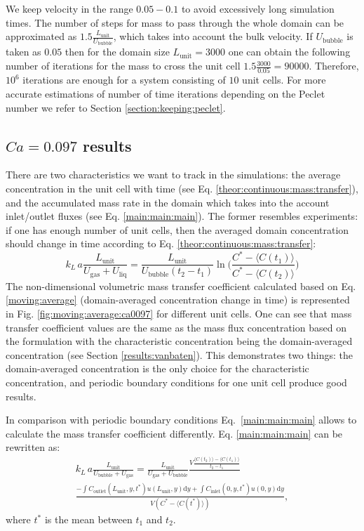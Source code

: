 \documentclass{article}
\newcommand{\beq}{\begin{equation}}
\newcommand{\feq}{\end{equation}}
\newcommand{\vol}{k_L\,a}
\newcommand{\lunit}{L_{\mathrm{unit}}}
\newcommand{\ububble}{U_{\mathrm{bubble}}}
\newcommand{\uliq}{U_{\mathrm{liq}}}
\newcommand{\ugas}{U_{\mathrm{gas}}}
\newcommand{\cinlet}{C_{\mathrm{inlet}}}
\newcommand{\coutlet}{C_{\mathrm{outlet}}}
\newcommand{\cstar}{C^{*}}
\newcommand{\volnondim}{\vol \frac{\lunit}{\ububble+\ugas}}
\begin{document}
We keep velocity in the range $0.05-0.1$ to avoid excessively long simulation times.
The number of steps for mass to pass through the whole domain can be approximated as $1.5 \frac{\lunit}{\ububble}$, which takes into account the bulk
velocity. If $\ububble$ is taken as $0.05$ then for
the domain size $\lunit=3000$ one can obtain the following number of iterations for the mass to
cross the unit cell $1.5 \frac{3000}{0.05}=90000$. Therefore, $10^{6}$ iterations are enough
for a system consisting of $10$ unit cells. For more accurate estimations of number of time
iterations depending on the Peclet number we refer to Section \ref{section:keeping:peclet}.

\subsection{$Ca=0.097$ results}
There are two characteristics we want to track in the simulations: the average
concentration in
the unit cell with time (see Eq. \ref{theor:continuous:mass:transfer}), and the accumulated mass
rate in the domain which takes into the account inlet/outlet fluxes (see Eq. \ref{main:main:main}). The former
resembles experiments: if one has enough number of unit cells, then the averaged domain
concentration should change in time according to Eq. \ref{theor:continuous:mass:transfer}: 
\beq
\label{moving:average}
\vol\frac{\lunit}{\ugas+\uliq}=\frac{\lunit}{\ububble (t_2
-t_1)}\ln\biggl(\frac{C^*-\langle C(t_1) \rangle}{C^*-\langle C(t_2)\rangle}\biggr)
\feq
The non-dimensional volumetric mass transfer coefficient calculated based on Eq.
\ref{moving:average} (domain-averaged concentration change in time) is
represented in Fig. \ref{fig:moving:average:ca0097} for different unit cells. One can see that mass transfer coefficient values are the same as the mass flux
concentration based on the \citeauthor{vanbaten-circular} formulation with the characteristic
concentration being the domain-averaged concentration (see Section
\ref{results:vanbaten}). This demonstrates two things:  the domain-averaged
concentration is the only choice for the characteristic concentration, and
periodic boundary conditions for one unit cell produce good results.

In comparison with periodic boundary conditions Eq.~\ref{main:main:main} allows
to calculate the mass transfer coefficient differently. Eq.
\ref{main:main:main}  can be rewritten as: \beq
\label{main:main:main:thorough}
\begin{aligned}
\volnondim=\frac{\lunit}{\ugas+\ububble} \frac{V \frac{\langle C(t_2)\rangle - \langle C(t_1)
\rangle}{t_2-t_1}}{}\\
\frac{-\int{\coutlet(\lunit,y,t^*) u(\lunit,y) \mathrm{d} y}+\int{\cinlet(0,y,t^*)
u(0,y)\mathrm{d} y}}{V (\cstar - \langle C(t^*) \rangle)},
\end{aligned}
\feq
where $t^*$ is the mean between $t_1$ and $t_2$.
\end{document}
